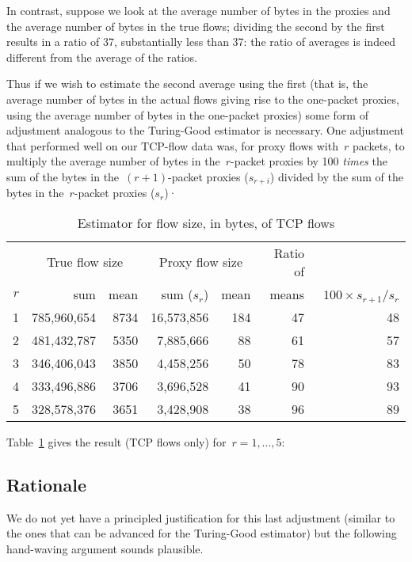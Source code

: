 \documentclass{paper}
\begin{document}
In contrast, suppose we look at the average number of bytes in the proxies and
the average number of bytes in the true flows; dividing the second by the first
results in a ratio of 37, substantially less than 37: the ratio of averages is
indeed different from the average of the ratios.

Thus if we wish to estimate the second average using the first (that is, the
average number of bytes in the actual flows giving rise to the one-packet
proxies, using the average number of bytes in the one-packet proxies) some form
of adjustment analogous to the Turing-Good estimator is necessary. One
adjustment that performed well on our TCP-flow data was, for proxy flows
with~$r$ packets, to multiply the average number of bytes in the~$r$-packet
proxies by 100 \emph{times} the sum of the bytes in the~$(r + 1)$-packet proxies
($s_{r+i}$) divided by the sum of the bytes in the~$r$-packet proxies ($s_r$)·

\begin{table}
\begin{center}
\begin{tabular}{r@{\hskip 1.7em}r r@{\hskip 1.7em}r r@{\hskip 1.7em}r r}
    & \multicolumn{2}{c}{True flow size} & \multicolumn{2}{c}{Proxy flow size} & Ratio of & \\
$r$ & sum & mean & sum ($s_r$) & mean & means &~$100 \times s_{r+1}/s_r$ \\
\midrule
1 & 785,960,654 & 8734 & 16,573,856 & 184 & 47 & 48 \\
2 & 481,432,787 & 5350 &  7,885,666 &  88 & 61 & 57 \\
3 & 346,406,043 & 3850 &  4,458,256 &  50 & 78 & 83 \\
4 & 333,496,886 & 3706 &  3,696,528 &  41 & 90 & 93 \\
5 & 328,578,376 & 3651 &  3,428,908 &  38 & 96 & 89 \\
\end{tabular}
\caption{Estimator for flow size, in bytes, of TCP flows}
\label{size_est}
\end{center}
\end{table}

Table~\ref{size_est} gives the result (TCP flows only) for~$r = 1, \dots, 5$:

\subsection{Rationale}

We do not yet have a principled justification for this last adjustment (similar
to the ones that can be advanced for the Turing-Good estimator) but the
following hand-waving argument sounds plausible.
\end{document}
